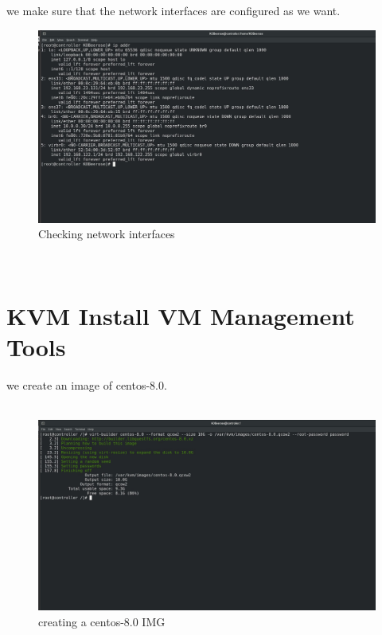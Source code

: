 \begin{spacing}{1.2}
\par we make sure that the network interfaces are configured as we want.
\\
\begin{figure}[!htb] 
\begin{center} 
\includegraphics[width=1\linewidth]{Cloud/Add Virtual Machine Images/KVM Install/Checking network interfaces} 
\end{center} 
\caption{Checking network interfaces} 
\end{figure}  \FloatBarrier
\\

\section{KVM Install VM Management Tools}

\par we create an image of centos-8.0.\\

\\
\begin{figure}[!htb] 
\begin{center} 
\includegraphics[width=1\linewidth]{Cloud/Add Virtual Machine Images/KVM Install VM Management Tools/creating a centos-8.0 IMG} 
\end{center} 
\caption{creating a centos-8.0 IMG} 
\end{figure}  \FloatBarrier
\\


\end{spacing}
